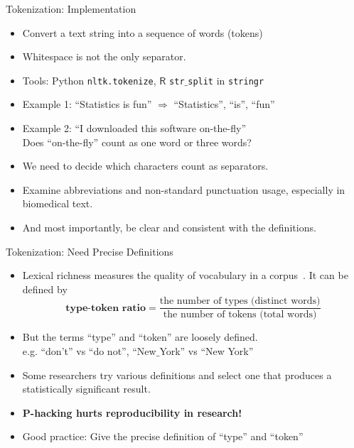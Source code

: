 \documentclass{beamer}
\renewcommand{\cite}{\citep}
\begin{document}
\begin{frame}{Tokenization: Implementation}
\begin{itemize}
\item Convert a text string into a sequence of words (tokens)
\item Whitespace is not the only separator.~\cite{clough2001perl}
\item Tools: Python \texttt{nltk.tokenize}, $\mathsf{R}$ \texttt{str$\_$split} in \texttt{stringr} 
	\bigskip
\item Example 1: ``Statistics is fun'' $\Rightarrow$ ``Statistics'', ``is'', ``fun''
\item Example 2: ``I downloaded this software on-the-fly''\\
	Does ``on-the-fly'' count as one word or three words?
	\bigskip
\item We need to decide which characters count as separators.
\item Examine abbreviations and non-standard punctuation usage, especially in biomedical text.~\cite{diaz2015analysis}
\item And most importantly, be clear and consistent with the definitions.
\end{itemize}
\end{frame}

\begin{frame}{Tokenization: Need Precise Definitions}
\begin{itemize}
\item Lexical richness measures the quality of vocabulary in a corpus~\cite{malvern2012measures}. It can be defined by
$$\textbf{type-token ratio} =  \dfrac{\text{the number of types (distinct words)}}{\text{the number of tokens (total words)}}$$
\item But the terms ``type'' and ``token'' are loosely defined.\\
e.g. ``don't'' vs ``do not'', ``New$\_$York'' vs ``New York''
	\bigskip
\item Some researchers try various definitions and select one that produces a statistically significant result.~\cite{cohen2019p-hacking}
\item\textbf{P-hacking hurts reproducibility in research!}~\cite{head2015extent}
\item Good practice: Give the precise definition of ``type'' and ``token''
\end{itemize}
\end{frame}
\end{document}
